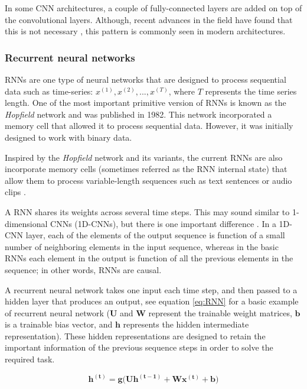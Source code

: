 In some CNN architectures, a couple of fully-connected layers are added on top of the convolutional layers. Although, recent advances in the field have found that this is not necessary \autocite{shelhamer2015}, this pattern is commonly seen in modern architectures.


\subsubsection{Recurrent neural networks}
\sloppy RNNs are one type of neural networks that are designed to process sequential data such as time-series: $x^{(1)}, x^{(2)}, ..., x^{(T)}$, where $T$ represents the time series length. One of the most important primitive version of RNNs is known as the \textit{Hopfield} network \autocite{hopfield1982} and was published in 1982. This network incorporated a memory cell that allowed it to process sequential data. However, it was initially designed to work with binary data.

Inspired by the \textit{Hopfield} network and its variants, the current RNNs are also incorporate memory cells (sometimes referred as the RNN internal state) that allow them to process variable-length sequences such as text sentences or audio clips \autocite{haykin1998}.

A RNN shares its weights across several time steps. This may sound similar to 1-dimensional CNNs (1D-CNNs), but there is one important difference \autocite{Goodfellow2016}. In a 1D-CNN layer, each of the elements of the output sequence is function of a small number of neighboring elements in the input sequence, whereas in the basic RNNs each element in the output is function of all the previous elements in the sequence; in other words, RNNs are causal. 

A recurrent neural network takes one input each time step, and then passed to a hidden layer that produces an output, see equation \ref{eq:RNN} for a basic example of recurrent neural network ($\mathbf{U}$ and $\mathbf{W}$ represent the trainable weight matrices, $\mathbf{b}$ is a trainable bias vector, and $\mathbf{h}$ represents the hidden intermediate representation). These hidden representations are designed to retain the important information of the previous sequence steps in order to solve the required task.

\begin{equation}
\label{eq:RNN}
\mathbf{h^{( t )}} = \mathbf{g(U h^{( t-1 )}} + \mathbf{W x^{( t )}} + \mathbf{b})
\end{equation}

